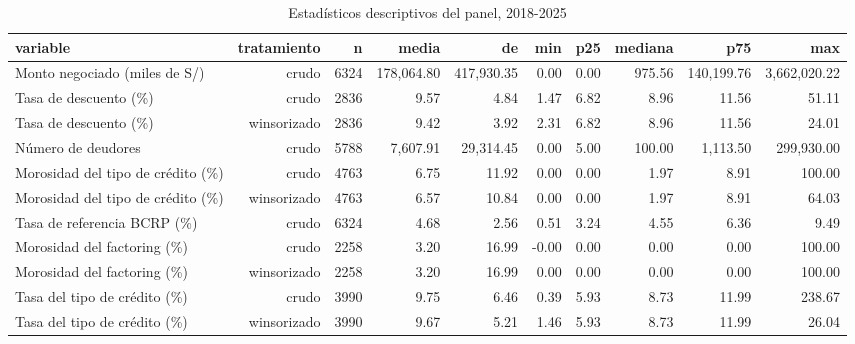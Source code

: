 \begin{table}[htbp]
\caption{Estadísticos descriptivos del panel, 2018-2025}
\label{tab:descriptivos}
\begin{tabular}{lrrrrrrrrr}
\toprule
variable & tratamiento & n & media & de & min & p25 & mediana & p75 & max \\
\midrule
Monto negociado (miles de S/) & crudo & 6324 & 178,064.80 & 417,930.35 & 0.00 & 0.00 & 975.56 & 140,199.76 & 3,662,020.22 \\
Tasa de descuento (\%) & crudo & 2836 & 9.57 & 4.84 & 1.47 & 6.82 & 8.96 & 11.56 & 51.11 \\
Tasa de descuento (\%) & winsorizado & 2836 & 9.42 & 3.92 & 2.31 & 6.82 & 8.96 & 11.56 & 24.01 \\
Número de deudores & crudo & 5788 & 7,607.91 & 29,314.45 & 0.00 & 5.00 & 100.00 & 1,113.50 & 299,930.00 \\
Morosidad del tipo de crédito (\%) & crudo & 4763 & 6.75 & 11.92 & 0.00 & 0.00 & 1.97 & 8.91 & 100.00 \\
Morosidad del tipo de crédito (\%) & winsorizado & 4763 & 6.57 & 10.84 & 0.00 & 0.00 & 1.97 & 8.91 & 64.03 \\
Tasa de referencia BCRP (\%) & crudo & 6324 & 4.68 & 2.56 & 0.51 & 3.24 & 4.55 & 6.36 & 9.49 \\
Morosidad del factoring (\%) & crudo & 2258 & 3.20 & 16.99 & -0.00 & 0.00 & 0.00 & 0.00 & 100.00 \\
Morosidad del factoring (\%) & winsorizado & 2258 & 3.20 & 16.99 & 0.00 & 0.00 & 0.00 & 0.00 & 100.00 \\
Tasa del tipo de crédito (\%) & crudo & 3990 & 9.75 & 6.46 & 0.39 & 5.93 & 8.73 & 11.99 & 238.67 \\
Tasa del tipo de crédito (\%) & winsorizado & 3990 & 9.67 & 5.21 & 1.46 & 5.93 & 8.73 & 11.99 & 26.04 \\
\bottomrule
\end{tabular}
\end{table}
